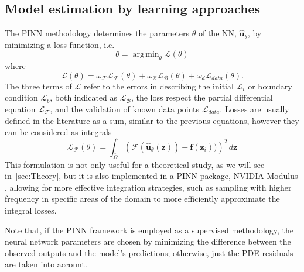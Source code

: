 \documentclass[pdflatex,sn-basic]{sn-jnl}%
\theoremstyle{thmstyleone}%
\theoremstyle{thmstyletwo}%
\theoremstyle{thmstylethree}%
\DeclareMathOperator*{\argmin}{arg\,min} %
\begin{document}
\subsection{Model estimation by learning approaches}\label{sec:ModelEstimation}

The PINN methodology determines the parameters $\theta$ of the NN, $\hat{\bm{u}}_\theta$, by minimizing a loss function, i.e.
\begin{equation*}
\theta =  \mathop{\argmin}_{\theta}  \mathcal{L}(\theta) 
\end{equation*}
where
\begin{equation}\label{eq:loss_pinn}
\mathcal{L}(\theta) = 
\omega_\mathcal{F} \mathcal{L}_\mathcal{F}(\theta) +
\omega_\mathcal{B} \mathcal{L}_\mathcal{B}(\theta) +
\omega_{d} \mathcal{L}_{data} (\theta) 
.
\end{equation}
The three terms of $\mathcal{L}$ refer to the errors in describing the initial $\mathcal{L}_{i}$ or boundary condition $\mathcal{L}_{b}$, both indicated as $\mathcal{L}_\mathcal{B}$, the loss respect the partial differential equation $\mathcal{L}_{\mathcal{F}}$, and the validation of known data points $\mathcal{L}_{data}$. 
Losses are usually defined in the literature as a sum, similar to the previous equations, however they can be considered as integrals
\begin{equation*}
\mathcal{L}_\mathcal{F}(\theta) 
= 
\int_{\bar{\Omega}} \left( \mathcal{F} (\hat{\bm{u}}_\theta(\bm{z}))   - \bm{f}(\bm{z}_i)) \right)^2 \, d\bm{z}
\end{equation*}
This formulation is not only useful for a theoretical study, as we will see in~\ref{sec:Theory}, but it is also implemented in a PINN package, NVIDIA Modulus \citep{Modulus2021}, allowing for more effective integration strategies, such as sampling with higher frequency in specific areas of the domain to more efficiently approximate the integral losses. 


Note that, if the PINN framework is employed as a supervised methodology, the neural network parameters are chosen by minimizing the difference between the observed outputs and the model's predictions; otherwise, just the PDE residuals are taken into account. 
\end{document}
